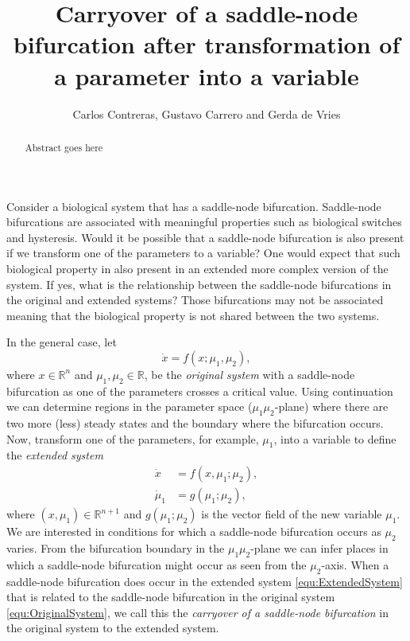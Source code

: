 \documentclass[12pt]{article}
\title{Carryover of a saddle-node bifurcation after transformation of a parameter into a variable}
\author{Carlos Contreras, Gustavo Carrero and Gerda de Vries}
\begin{document}
\maketitle


\begin{abstract}
Abstract goes here
\end{abstract}
 

\linenumbers

Consider a biological system that has a saddle-node bifurcation. Saddle-node bifurcations are associated with meaningful properties such as biological switches and hysteresis. Would it be possible that a saddle-node bifurcation is also present if we transform one of the parameters to a variable? One would expect that such biological property in also present in an extended more complex version of the system. If yes, what is the relationship between the saddle-node bifurcations in the original and extended systems? Those bifurcations may not be associated meaning that the biological property is not shared between the two systems.

In the general case, let
\begin{equation}
    \dot x = f(x;\mu_{1},\mu_{2}),
    \label{equ:OriginalSystem}
\end{equation}
where $x\in\mathbb{R}^{n}$ and $\mu_{1},\mu_{2}\in\mathbb{R}$, be the \textit{original system} with a saddle-node bifurcation as one of the parameters crosses a critical value. Using continuation we can determine regions in the parameter space ($\mu_{1}\mu_{2}$-plane) where there are two more (less) steady states and the boundary where the bifurcation occurs. Now, transform one of the parameters, for example, $\mu_{1}$, into a variable to define the \textit{extended system}
\begin{equation}
    \begin{aligned}
    \dot x &= f(x,\mu_{1}; \mu_{2}), \\
    \dot \mu_{1} &= g(\mu_{1}; \mu_{2}),
    \end{aligned}
    \label{equ:ExtendedSystem}
\end{equation}
where $(x, \mu_{1})\in\mathbb{R}^{n+1}$ and $g(\mu_{1}; \mu_{2})$ is the vector field of the new variable $\mu_{1}$. We are interested in conditions for which a saddle-node bifurcation occurs as $\mu_{2}$ varies. From the bifurcation boundary in the $\mu_{1}\mu_{2}$-plane we can infer places in which a saddle-node bifurcation might occur as seen from the $\mu_{2}$-axis. When a saddle-node bifurcation does occur in the extended system \eqref{equ:ExtendedSystem} that is related to the saddle-node bifurcation in the original system \eqref{equ:OriginalSystem}, we call this the \textit{carryover of a saddle-node bifurcation} in the original system to the extended system. 
\end{document}
